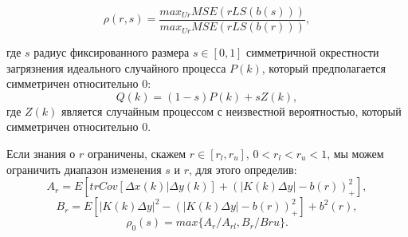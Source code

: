 \begin{equation}
\rho(r,s)=\frac{max_{Ur}MSE(rLS(b(s)))}{max_{Ur}MSE(rLS(b(r)))},
\end{equation}

\noindent где $s$ радиус фиксированного размера $s\in[0,1]$ симметричной окрестности загрязнения идеального случайного процесса $P(k)$, который предполагается симметричен относительно $0$:
\begin{equation}
Q(k)=(1-s)P(k)+sZ(k),
\end{equation}
\noindent где $Z(k)$ является случайным процессом с неизвестной вероятностью, который симметричен относительно $0$.

Если знания о $r$ ограничены, скажем $r\in[r_l,r_u]$, $0<r_l<r_u<1$, мы можем ограничить диапазон изменения $s$ и $r$, для этого определив:
\begin{equation}
A_r=E\left[trCov[\Delta x(k)|\Delta y(k)]+(|K(k)\Delta y|-b(r))_+^2\right],
\end{equation}
\begin{equation}
B_r=E\left[|K(k)\Delta y|^2-(|K(k)\Delta y|-b(r))^2_+\right]+b^2(r),
\end{equation}
\begin{equation}
\rho_0(s)=max\{A_r/A_{rl},B_r/B{ru}\}.
\end{equation}

